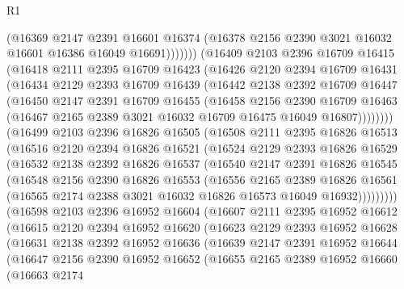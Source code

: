 \begin{lexlean}{R1}
\begin{coremodule}
              (@16369
                @2147
                @2391
                @16601
                @16374
                (@16378 @2156 @2390 @3021 @16032 @16601 @16386 @16049 @16691)))))))
    (@16409
      @2103
      @2396
      @16709
      @16415
      (@16418
        @2111
        @2395
        @16709
        @16423
        (@16426
          @2120
          @2394
          @16709
          @16431
          (@16434
            @2129
            @2393
            @16709
            @16439
            (@16442
              @2138
              @2392
              @16709
              @16447
              (@16450
                @2147
                @2391
                @16709
                @16455
                (@16458
                  @2156
                  @2390
                  @16709
                  @16463
                  (@16467 @2165 @2389 @3021 @16032 @16709 @16475 @16049 @16807))))))))
    (@16499
      @2103
      @2396
      @16826
      @16505
      (@16508
        @2111
        @2395
        @16826
        @16513
        (@16516
          @2120
          @2394
          @16826
          @16521
          (@16524
            @2129
            @2393
            @16826
            @16529
            (@16532
              @2138
              @2392
              @16826
              @16537
              (@16540
                @2147
                @2391
                @16826
                @16545
                (@16548
                  @2156
                  @2390
                  @16826
                  @16553
                  (@16556
                    @2165
                    @2389
                    @16826
                    @16561
                    (@16565 @2174 @2388 @3021 @16032 @16826 @16573 @16049 @16932)))))))))
    (@16598
      @2103
      @2396
      @16952
      @16604
      (@16607
        @2111
        @2395
        @16952
        @16612
        (@16615
          @2120
          @2394
          @16952
          @16620
          (@16623
            @2129
            @2393
            @16952
            @16628
            (@16631
              @2138
              @2392
              @16952
              @16636
              (@16639
                @2147
                @2391
                @16952
                @16644
                (@16647
                  @2156
                  @2390
                  @16952
                  @16652
                  (@16655
                    @2165
                    @2389
                    @16952
                    @16660
                    (@16663
                      @2174

\end{coremodule}
\end{lexlean}
